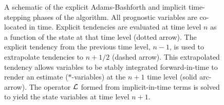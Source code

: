 \begin{figure}
\begin{center}
\end{center}
\caption{
A schematic of the explicit Adams-Bashforth and implicit time-stepping
phases of the algorithm. All prognostic variables are co-located in
time. Explicit tendencies are evaluated at time level $n$ as a
function of the state at that time level (dotted arrow). The explicit
tendency from the previous time level, $n-1$, is used to extrapolate
tendencies to $n+1/2$ (dashed arrow). This extrapolated tendency
allows variables to be stably integrated forward-in-time to render an
estimate ($*$-variables) at the $n+1$ time level (solid
arc-arrow). The operator ${\cal L}$ formed from implicit-in-time terms
is solved to yield the state variables at time level $n+1$. }
\label{fig:adams-bashforth-sync}
\end{figure}

